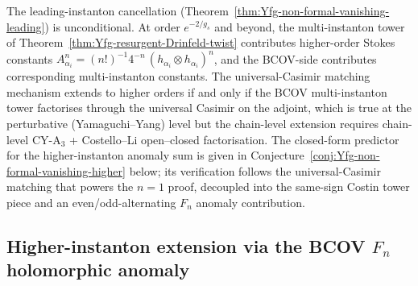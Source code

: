 \begin{remark}
\label{rem:Yfg-non-formal-higher-conditional}
The leading-instanton cancellation
\textup{(}Theorem~\ref{thm:Yfg-non-formal-vanishing-leading}\textup{)}
is unconditional. At order $e^{-2/g_s}$ and beyond, the multi-instanton
tower of
Theorem~\ref{thm:Yfg-resurgent-Drinfeld-twist}
contributes higher-order Stokes constants $A^n_{\alpha_i} = (n!)^{-1}
4^{-n}\, (h_{\alpha_i} \otimes h_{\alpha_i})^n$, and the BCOV-side
contributes corresponding multi-instanton constants. The
universal-Casimir matching mechanism extends to higher orders if and
only if the BCOV multi-instanton tower factorises through the universal
Casimir on the adjoint, which is true at the perturbative
\textup{(}Yamaguchi--Yang\textup{)} level but the chain-level extension
requires chain-level CY-A$_3$ + Costello--Li open--closed factorisation.
The closed-form predictor for the higher-instanton anomaly sum is given
in Conjecture~\ref{conj:Yfg-non-formal-vanishing-higher} below; its
verification follows the universal-Casimir matching that powers the
$n = 1$ proof, decoupled into the same-sign Costin tower piece and an
even/odd-alternating $F_n$ anomaly contribution.
\end{remark}

\subsection{Higher-instanton extension via the BCOV \texorpdfstring{$F_n$}{F-n} holomorphic
 anomaly}
\label{subsec:Yfg-non-formal-higher-instanton}

